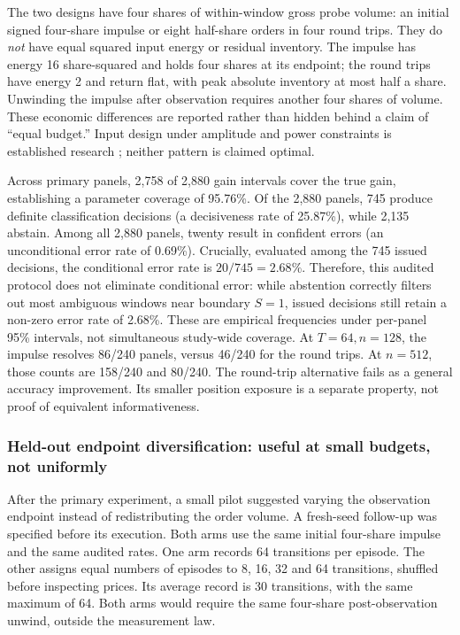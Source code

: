 \documentclass[10pt,twocolumn,letterpaper]{article}
\theoremstyle{definition}
\theoremstyle{remark}
\begin{document}
The two designs have four shares of within-window gross probe volume: an initial signed four-share impulse or eight half-share orders in four round trips. They do \emph{not} have equal squared input energy or residual inventory. The impulse has energy 16 share-squared and holds four shares at its endpoint; the round trips have energy 2 and return flat, with peak absolute inventory at most half a share. Unwinding the impulse after observation requires another four shares of volume. These economic differences are reported rather than hidden behind a claim of ``equal budget.'' Input design under amplitude and power constraints is established research \citep{manchester2010}; neither pattern is claimed optimal.

Across primary panels, 2,758 of 2,880 gain intervals cover the true gain, establishing a parameter coverage of 95.76\%. Of the 2,880 panels, 745 produce definite classification decisions (a decisiveness rate of 25.87\%), while 2,135 abstain. Among all 2,880 panels, twenty result in confident errors (an unconditional error rate of 0.69\%). Crucially, evaluated among the 745 issued decisions, the conditional error rate is $20 / 745 = \mathbf{2.68\%}$. Therefore, this audited protocol does not eliminate conditional error: while abstention correctly filters out most ambiguous windows near boundary $S=1$, issued decisions still retain a non-zero error rate of 2.68\%. These are empirical frequencies under per-panel 95\% intervals, not simultaneous study-wide coverage. At $T=64,n=128$, the impulse resolves 86/240 panels, versus 46/240 for the round trips. At $n=512$, those counts are 158/240 and 80/240. The round-trip alternative fails as a general accuracy improvement. Its smaller position exposure is a separate property, not proof of equivalent informativeness.

\subsubsection{Held-out endpoint diversification: useful at small budgets, not uniformly}
After the primary experiment, a small pilot suggested varying the observation endpoint instead of redistributing the order volume. A fresh-seed follow-up was specified before its execution. Both arms use the same initial four-share impulse and the same audited rates. One arm records 64 transitions per episode. The other assigns equal numbers of episodes to 8, 16, 32 and 64 transitions, shuffled before inspecting prices. Its average record is 30 transitions, with the same maximum of 64. Both arms would require the same four-share post-observation unwind, outside the measurement law.
\end{document}
